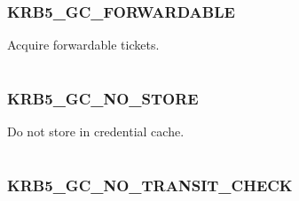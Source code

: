 \documentclass[letterpaper,10pt,english]{sphinxmanual}
\begin{document}
\subsubsection{KRB5\_GC\_FORWARDABLE}
\label{appdev/refs/macros/KRB5_GC_FORWARDABLE:krb5-gc-forwardable-data}\label{appdev/refs/macros/KRB5_GC_FORWARDABLE:krb5-gc-forwardable}\label{appdev/refs/macros/KRB5_GC_FORWARDABLE::doc}

\begin{fulllineitems}
\label{appdev/refs/macros/KRB5_GC_FORWARDABLE:KRB5_GC_FORWARDABLE}
\end{fulllineitems}


Acquire forwardable tickets.

\begin{tabulary}{\linewidth}{|L|L|}
\hline

 & 
\\\hline
\end{tabulary}



\subsubsection{KRB5\_GC\_NO\_STORE}
\label{appdev/refs/macros/KRB5_GC_NO_STORE::doc}\label{appdev/refs/macros/KRB5_GC_NO_STORE:krb5-gc-no-store}\label{appdev/refs/macros/KRB5_GC_NO_STORE:krb5-gc-no-store-data}

\begin{fulllineitems}
\label{appdev/refs/macros/KRB5_GC_NO_STORE:KRB5_GC_NO_STORE}
\end{fulllineitems}


Do not store in credential cache.

\begin{tabulary}{\linewidth}{|L|L|}
\hline

 & 
\\\hline
\end{tabulary}



\subsubsection{KRB5\_GC\_NO\_TRANSIT\_CHECK}
\label{appdev/refs/macros/KRB5_GC_NO_TRANSIT_CHECK:krb5-gc-no-transit-check-data}\label{appdev/refs/macros/KRB5_GC_NO_TRANSIT_CHECK:krb5-gc-no-transit-check}\label{appdev/refs/macros/KRB5_GC_NO_TRANSIT_CHECK::doc}
\end{document}
